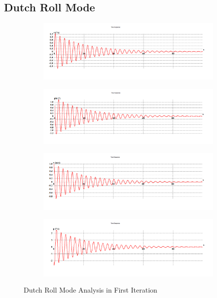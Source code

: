 \subsection{Dutch Roll Mode}
\begin{figure}[H]
\begin{subfigure}{0.48\textwidth}
\includegraphics[width = \linewidth]{r__1_.png}
\end{subfigure}
\begin{subfigure}{0.48\textwidth}
\includegraphics[width = \linewidth]{phi__1_.png}
\end{subfigure}
\medskip
\begin{subfigure}{0.48\textwidth}
\includegraphics[width = \linewidth]{v__1_.png}
\end{subfigure}
\begin{subfigure}{0.48\textwidth}
\includegraphics[width = \linewidth]{p__1_.png}
\end{subfigure}
\caption{Dutch Roll Mode Analysis in First Iteration}
\end{figure}
